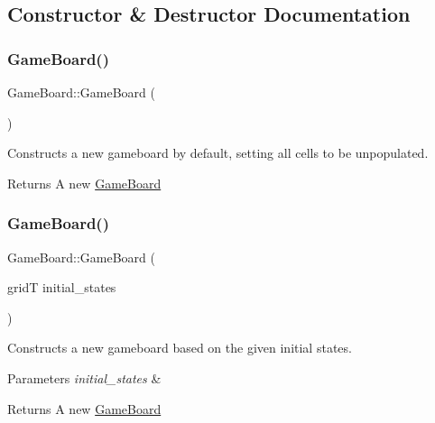 \subsection{Constructor \& Destructor Documentation}
\mbox{\label{class_game_board_ac622cadcc81b3ffb71d8feb4506c04ac}} 
\subsubsection{\texorpdfstring{GameBoard()}{GameBoard()}\hspace{0.1cm}{\footnotesize\ttfamily [1/2]}}
{\footnotesize\ttfamily Game\+Board\+::\+Game\+Board (\begin{DoxyParamCaption}{ }\end{DoxyParamCaption})}



Constructs a new gameboard by default, setting all cells to be unpopulated. 

\begin{DoxyReturn}{Returns}
A new \mbox{\hyperlink{class_game_board}{Game\+Board}} 
\end{DoxyReturn}
\mbox{\label{class_game_board_a82ca7599d8ef010f04cde54441570ee4}} 
\subsubsection{\texorpdfstring{GameBoard()}{GameBoard()}\hspace{0.1cm}{\footnotesize\ttfamily [2/2]}}
{\footnotesize\ttfamily Game\+Board\+::\+Game\+Board (\begin{DoxyParamCaption}\item[{gridT}]{initial\+\_\+states }\end{DoxyParamCaption})}



Constructs a new gameboard based on the given initial states. 


\begin{DoxyParams}{Parameters}
{\em initial\+\_\+states} & \\
\hline
\end{DoxyParams}
\begin{DoxyReturn}{Returns}
A new \mbox{\hyperlink{class_game_board}{Game\+Board}} 
\end{DoxyReturn}


